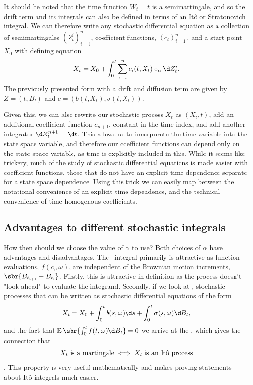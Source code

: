 It should be noted that the time function \(W_t = t\) is a semimartingale, and so the drift term and its integrals can also be defined in terms of an {I}t\^o or Stratonovich integral.
We can therefore write any stochastic differential equation as a collection of semimartingales \((Z^i_t)_{i=1}^n\), coefficient functions, \((c_i)_{i=1}^n,\) and a start point \(X_0\) with defining equation
\[X_t = X_0 +  \int_0^t \sum_{i=1}^n c_i(t, X_t) \circ_\alpha \d Z^i_t \label{def:general_sde}.\]
The previously presented form with a drift and diffusion term are given by \(Z = (t, B_t)\) and \(c = (b(t, X_t), \sigma(t, X_t))\).

Given this, we can also rewrite our stochastic process \(X_t\) as \((X_t, t)\), add an additional coefficient function \(c_{n+1}\), constant in the time index, and add another integrator \(\d Z_t^{n+1} = \d t\).
This allows us to incorporate the time variable into the state space variable, and therefore our coefficient functions can depend only on the state-space variable, as time is explicitly included in this.
While it seems like trickery, much of the study of stochastic differential equations is made easier with  coefficient functions, those that do not have an explicit time dependence separate for a state space dependence.
Using this trick we can easily map between the notational convenience of an explicit time dependence, and the technical convenience of time-homogenous coefficients.

\subsection{Advantages to different stochastic integrals}\label{sec:advantage_of_stochastic_integrals}
How then should we choose the value of \(\alpha\) to use?
Both choices of \(\alpha\) have advantages and disadvantages.
The \ito~integral primarily is attractive as function evaluations, \(f(c_i, \omega)\), are independent of the Brownian motion increments, \(\sbr{B_{t_{i+1}} - B_{t_i}}\).
Firstly, this is attractive in definition as the process doesn't "look ahead" to evaluate the integrand.
Secondly, if we look at , stochastic processes that can be written as stochastic differential equations of the form \[X_t = X_0 + \int_0^t b(s, \omega) \d s + \int_0^t \sigma(s, \omega) \d B_t\label{eq:ito:process},\] and the fact that \(\E\sbr{\int_0^t f(t, \omega) \d B_t} = 0\) we arrive at the , which gives the connection that \[X_t \text{ is a martingale} \iff X_t \text{ is an {I}t\^o{}~process}\] \parencite[theorem 4.3.4]{oksendal2003stochastic}.
This property is very useful mathematically and makes proving statements about {I}t\^o integrals much easier.


